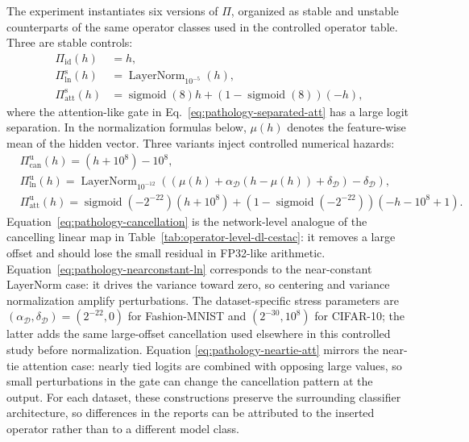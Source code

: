 \documentclass[manuscript, screen]{acmart}
\begin{document}
The experiment instantiates six versions of $\Pi$, organized as stable and
unstable counterparts of the same operator classes used in the controlled
operator table. Three are stable controls:
\begin{align}
\Pi_{\mathrm{id}}(h)&=h,
\label{eq:pathology-identity}\\
\Pi_{\mathrm{ln}}^{\mathrm{s}}(h)
&=
\operatorname{LayerNorm}_{10^{-5}}(h),
\label{eq:pathology-regular-ln}\\
\Pi_{\mathrm{att}}^{\mathrm{s}}(h)
&=
\operatorname{sigmoid}(8)h+\left(1-\operatorname{sigmoid}(8)\right)(-h),
\label{eq:pathology-separated-att}
\end{align}
where the attention-like gate in Eq.~\eqref{eq:pathology-separated-att} has a
large logit separation. In the normalization formulas below, $\mu(h)$ denotes
the feature-wise mean of the hidden vector. Three variants inject controlled
numerical hazards:
\begin{align}
&\Pi_{\mathrm{can}}^{\mathrm{u}}(h)
=(h+10^{8})-10^{8},
\label{eq:pathology-cancellation}\\
&\Pi_{\mathrm{ln}}^{\mathrm{u}}(h)
=
\operatorname{LayerNorm}_{10^{-12}}
\!\left((\mu(h)+\alpha_{\mathcal{D}}(h-\mu(h))+\delta_{\mathcal{D}})-\delta_{\mathcal{D}}\right),
\label{eq:pathology-nearconstant-ln}\\
&\Pi_{\mathrm{att}}^{\mathrm{u}}(h)
=
\operatorname{sigmoid}(-2^{-22})(h+10^{8})
+
\left(1-\operatorname{sigmoid}(-2^{-22})\right)(-h-10^{8}+1).
\label{eq:pathology-neartie-att}
\end{align}
Equation~\eqref{eq:pathology-cancellation} is the network-level analogue of
the cancelling linear map in Table~\ref{tab:operator-level-dl-cestac}: it
removes a large offset and should lose the small residual in FP32-like
arithmetic. Equation~\eqref{eq:pathology-nearconstant-ln} corresponds to the near-constant LayerNorm case: it drives the variance toward zero, so centering
and variance normalization amplify perturbations. The dataset-specific
stress parameters are $(\alpha_{\mathcal{D}},\delta_{\mathcal{D}})=(2^{-22},0)$
for Fashion-MNIST and $(2^{-30},10^8)$ for CIFAR-10; the latter adds the same
large-offset cancellation used elsewhere in this controlled study before
normalization. Equation
\eqref{eq:pathology-neartie-att} mirrors the near-tie attention case: nearly
tied logits are combined with opposing large values, so small perturbations in
the gate can change the cancellation pattern at the output. For each dataset, these
constructions preserve the surrounding classifier architecture, so
differences in the reports can be attributed to the inserted operator rather
than to a different model class.
\end{document}
